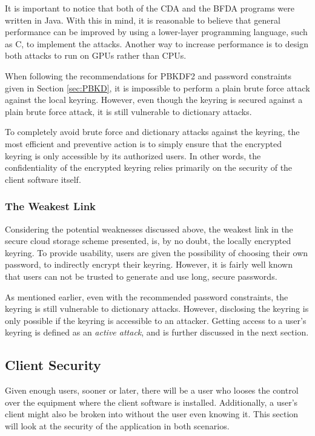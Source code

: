 \documentclass[pdftex,english,10pt,b5paper,twoside]{book}
\begin{document}
It is important to notice that both of the \ac{CDA} and the \ac{BFDA} programs
were written in Java. With this in mind, it is reasonable to believe that
general performance can be improved by using a lower-layer programming
language, such as C, to implement the attacks. Another way to increase
performance is to design both attacks to run on \acp{GPU} rather than
\acp{CPU}.

When following the recommendations for \ac{PBKDF2} and password constraints
given in Section \ref{sec:PBKD}, it is impossible to perform a plain brute
force attack against the local keyring. However, even though the keyring is
secured against a plain brute force attack, it is still vulnerable to
dictionary attacks.

To completely avoid brute force and dictionary attacks against the keyring, the
most efficient and preventive action is to simply ensure that the encrypted
keyring is only accessible by its authorized users. In other words, the
confidentiality of the encrypted keyring relies primarily on the security of
the client software itself.

\subsubsection{The Weakest Link}

Considering the potential weaknesses discussed above, the weakest link in the
secure cloud storage scheme presented, is, by no doubt, the locally encrypted
keyring. To provide usability, users are given the possibility of choosing
their own password, to indirectly encrypt their keyring. However, it is fairly
well known that users can not be trusted to generate and use long, secure
passwords.

As mentioned earlier, even with the recommended password constraints, the
keyring is still vulnerable to dictionary attacks. However, disclosing the
keyring is only possible if the keyring is accessible to an attacker. Getting
access to a user's keyring is defined as an \emph{active attack}, and is
further discussed in the next section.

\subsection{Client Security}

Given enough users, sooner or later, there will be a user who looses the
control over the equipment where the client software is installed.
Additionally, a user's client might also be broken into without the user even
knowing it. This section will look at the security of the application in both
scenarios.
\end{document}
